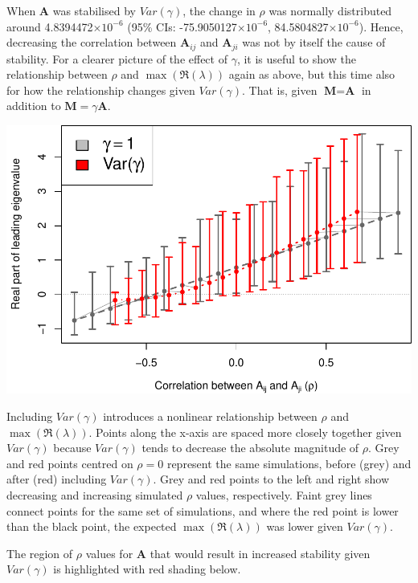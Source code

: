 \documentclass[]{article}
\begin{document}
When \(\textbf{A}\) was stabilised by \(Var(\gamma)\), the change in
\(\rho\) was normally distributed around 4.8394472\(\times 10^{-6}\)
(95\% CIs: -75.9050127\(\times 10^{-6}\), 84.5804827\(\times 10^{-6}\)).
Hence, decreasing the correlation between \(\textbf{A}_{ij}\) and
\(\textbf{A}_{ji}\) was not by itself the cause of stability. For a
clearer picture of the effect of \(\gamma\), it is useful to show the
relationship between \(\rho\) and \(\max(\Re(\lambda))\) again as above,
but this time also for how the relationship changes given
\(Var(\gamma)\). That is, given \(\textbf{M} = \textbf{A}\) in addition
to \(\textbf{M} = \gamma\textbf{A}\).

\includegraphics{revision_notes_files/figure-latex/unnamed-chunk-11-1.pdf}

Including \(Var(\gamma)\) introduces a nonlinear relationship between
\(\rho\) and \(\max(\Re(\lambda))\). Points along the x-axis are spaced
more closely together given \(Var(\gamma)\) because \(Var(\gamma)\)
tends to decrease the absolute magnitude of \(\rho\). Grey and red
points centred on \(\rho = 0\) represent the same simulations, before
(grey) and after (red) including \(Var(\gamma)\). Grey and red points to
the left and right show decreasing and increasing simulated \(\rho\)
values, respectively. Faint grey lines connect points for the same set
of simulations, and where the red point is lower than the black point,
the expected \(\max(\Re(\lambda))\) was lower given \(Var(\gamma)\).

The region of \(\rho\) values for \(\textbf{A}\) that would result in
increased stability given \(Var(\gamma)\) is highlighted with red
shading below.
\end{document}
